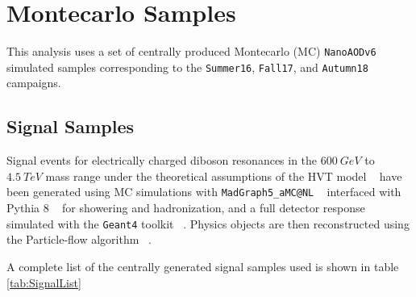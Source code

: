 \section{Montecarlo Samples}

This analysis uses a set of centrally produced Montecarlo (MC) \verb|NanoAODv6|
simulated samples corresponding to the \verb|Summer16|, \verb|Fall17|,
and \verb|Autumn18| campaigns.


\subsection {Signal Samples}

Signal events for electrically charged diboson resonances in the $600~GeV$
to $4.5~TeV$ mass range under the theoretical assumptions of the HVT model ~\cite{hvt2014}
have been generated using MC simulations with \verb|MadGraph5_aMC@NL| ~\cite{madgraph}
interfaced with Pythia 8 ~\cite{pythia} for showering and hadronization, and a
full detector response simulated with the \verb|Geant4| toolkit ~\cite{geant4}.
Physics objects are then reconstructed using the Particle-flow
algorithm ~\cite{particleflow}.

A complete list of the centrally generated signal samples used is shown in
table \ref{tab:SignalList}


